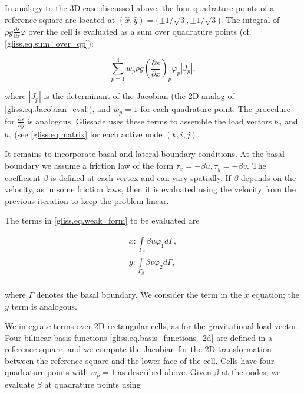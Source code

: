 \noindent
In analogy to the 3D case discussed above, the four quadrature points of a reference square are located at
$(\hat{x},\hat{y}) = (\pm 1/\sqrt{3}, \pm 1/\sqrt{3}$).  The integral of $\rho g \frac{\partial s}{\partial x} \varphi$
over the cell is evaluated as a sum over quadrature points (cf. \eqref{gliss.eq.sum_over_qp}):

\begin{equation}
  \label{gliss.eq.sum_over_qp_gravity}
  \sum\limits_{p=1}^{4} { w_p \rho g (\frac{\partial s}{\partial x})_p \varphi_p |J_p|},
\end{equation}

\noindent
where $|J_p|$ is the determinant of the Jacobian (the 2D analog of \eqref{gliss.eq.Jacobian_eval}),
and $w_p = 1$ for each quadrature point. The procedure for $\frac{\partial s}{\partial y}$ is analogous.
Glissade uses these terms to assemble the load vectors $b_u$ and $b_v$ (see \eqref{gliss.eq.matrix} 
for each active node $(k,i,j)$.

It remains to incorporate basal and lateral boundary conditions.  At the basal boundary we assume
a friction law of the form $\tau_x = -\beta u, \tau_y = -\beta v$.  The coefficient $\beta$ is defined
at each vertex and can vary spatially.  If $\beta$ depends on the velocity, as in some friction laws,
then it is evaluated using the velocity from the previous iteration to keep the problem linear.

The terms in \eqref{gliss.eq.weak_form} to be evaluated are

\begin{equation}
  \label{gliss.eq.basal_bc}
  \begin{split}
    x: \int\limits_{{{\Gamma }_{\beta }}} \beta u{{\varphi }_{1}} d\Gamma , \\
    y: \int\limits_{{{\Gamma }_{\beta }}} \beta v{{\varphi }_{2}} d\Gamma , \\
  \end{split}
\end{equation}

\noindent
where $\Gamma$ denotes the basal boundary. We consider the term in the $x$ equation; the $y$ term is analogous. 

We integrate terms over 2D rectangular cells, as for the gravitational load vector.
Four bilinear basis functions \eqref{gliss.eq.basis_functions_2d} are defined in a reference square,
and we compute the Jacobian for the 2D transformation between the reference square and the lower face of the cell.
Cells have four quadrature points with $w_p = 1$ as described above.  Given $\beta$ at the nodes,
we evaluate $\beta$ at quadrature points using

